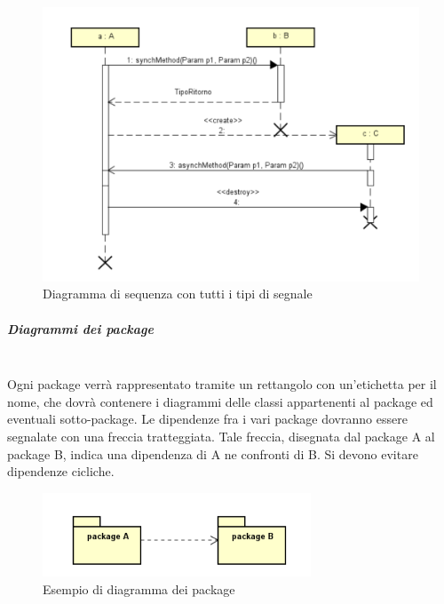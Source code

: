 	\begin{figure}[H]
		\centering
		\includegraphics[width=13cm,keepaspectratio]{img/DiagrammaDiSequenza.png}
		\caption{Diagramma di sequenza con tutti i tipi di segnale}
	\end{figure}





\subparagraph{Diagrammi dei package}\mbox{}\\
Ogni package verrà rappresentato tramite un rettangolo con un’etichetta per il nome, che dovrà contenere i diagrammi delle classi appartenenti al package ed eventuali sotto-package. Le dipendenze fra i vari package dovranno
essere segnalate con una freccia tratteggiata. Tale freccia, disegnata dal package A al package B, indica una dipendenza di A ne confronti di B. Si devono evitare dipendenze cicliche.
\begin{figure}[H]
		\centering
		\includegraphics[width=8cm,keepaspectratio]{img/DiagrammaFraPackages.png}
		\caption{Esempio di diagramma dei package}
	\end{figure}


